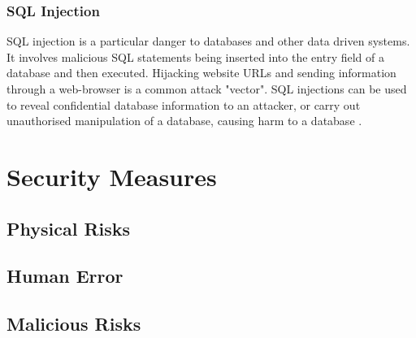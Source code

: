 \documentclass[11pt]{article}
\begin{document}
\subsubsection{SQL Injection}
SQL injection is a particular danger to databases and other data driven systems.  It involves malicious SQL statements being inserted into the entry field of a database and then executed.  Hijacking website URLs and sending information through a web-browser is a common attack "vector".  SQL injections can be used to reveal confidential database information to an attacker, or carry out unauthorised manipulation of a database, causing harm to a database \cite{Bas}.

\section{Security Measures}
\subsection{Physical Risks}
\subsection{Human Error}
\subsection{Malicious Risks}
\end{document}
